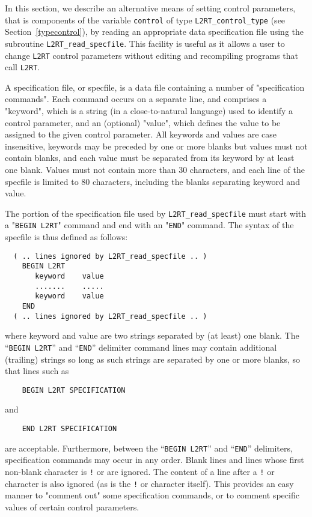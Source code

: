 \documentclass{galahad}
\newcommand{\packagename}{L2\-RT}
\begin{document}

\galfeatures
\noindent In this section, we describe an alternative means of setting
control parameters, that is components of the variable {\tt control} of type
{\tt \packagename\_control\_type}
(see Section~\ref{typecontrol}),
by reading an appropriate data specification file using the
subroutine {\tt \packagename\_read\_specfile}. This facility
is useful as it allows a user to change  {\tt \packagename} control parameters
without editing and recompiling programs that call {\tt \packagename}.

A specification file, or specfile, is a data file containing a number of
"specification commands". Each command occurs on a separate line,
and comprises a "keyword",
which is a string (in a close-to-natural language) used to identify a
control parameter, and
an (optional) "value", which defines the value to be assigned to the given
control parameter. All keywords and values are case insensitive,
keywords may be preceded by one or more blanks but
values must not contain blanks, and
each value must be separated from its keyword by at least one blank.
Values must not contain more than 30 characters, and
each line of the specfile is limited to 80 characters,
including the blanks separating keyword and value.

The portion of the specification file used by
{\tt \packagename\_read\_specfile}
must start
with a "{\tt BEGIN \packagename}" command and end with an
"{\tt END}" command.  The syntax of the specfile is thus defined as follows:
\begin{verbatim}
  ( .. lines ignored by L2RT_read_specfile .. )
    BEGIN L2RT
       keyword    value
       .......    .....
       keyword    value
    END
  ( .. lines ignored by L2RT_read_specfile .. )
\end{verbatim}
where keyword and value are two strings separated by (at least) one blank.
The ``{\tt BEGIN \packagename}'' and ``{\tt END}'' delimiter command lines
may contain additional (trailing) strings so long as such strings are
separated by one or more blanks, so that lines such as
\begin{verbatim}
    BEGIN L2RT SPECIFICATION
\end{verbatim}
and
\begin{verbatim}
    END L2RT SPECIFICATION
\end{verbatim}
are acceptable. Furthermore,
between the
``{\tt BEGIN \packagename}'' and ``{\tt END}'' delimiters,
specification commands may occur in any order.  Blank lines and
lines whose first non-blank character is {\tt !} or {\tt *} are ignored.
The content
of a line after a {\tt !} or {\tt *} character is also
ignored (as is the {\tt !} or {\tt *}
character itself). This provides an easy manner to "comment out" some
specification commands, or to comment specific values
of certain control parameters.
\end{document}
